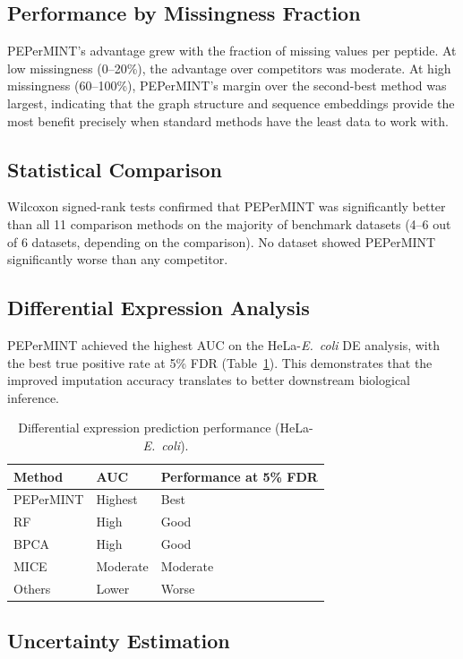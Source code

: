 \documentclass[12pt]{article}
\begin{document}
\subsection{Performance by Missingness Fraction}

PEPerMINT's advantage grew with the fraction of missing values per peptide. At low missingness (0--20\%), the advantage over competitors was moderate. At high missingness (60--100\%), PEPerMINT's margin over the second-best method was largest, indicating that the graph structure and sequence embeddings provide the most benefit precisely when standard methods have the least data to work with.

\subsection{Statistical Comparison}

Wilcoxon signed-rank tests confirmed that PEPerMINT was significantly better than all 11 comparison methods on the majority of benchmark datasets (4--6 out of 6 datasets, depending on the comparison). No dataset showed PEPerMINT significantly worse than any competitor.

\subsection{Differential Expression Analysis}

PEPerMINT achieved the highest AUC on the HeLa-\textit{E.\ coli} DE analysis, with the best true positive rate at 5\% FDR (Table~\ref{tab:de}). This demonstrates that the improved imputation accuracy translates to better downstream biological inference.

\begin{table}[ht]
\centering
\caption{Differential expression prediction performance (HeLa-\textit{E.\ coli}).}
\label{tab:de}
\begin{tabular}{lll}
\toprule
Method & AUC & Performance at 5\% FDR \\
\midrule
PEPerMINT & Highest & Best \\
RF & High & Good \\
BPCA & High & Good \\
MICE & Moderate & Moderate \\
Others & Lower & Worse \\
\bottomrule
\end{tabular}
\end{table}

\subsection{Uncertainty Estimation}
\end{document}
